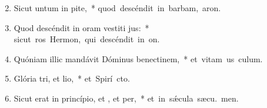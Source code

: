 \begin{flushleft}
\begin{enumerate}[leftmargin=*]
\setcounter{enumi}{1}

\item Sicut untum in pite,~* \mbox{quod descéndit in barbam,  aron.}
\item Quod descéndit in oram vestiti jus:~* \mbox{sicut ros Hermon, qui descéndit in  on.}
\item Quóniam illic mandávit Dóminus benectinem,~* \mbox{et vitam us  culum.}
\item Glória tri, et lio,~* \mbox{et Spirí cto.}
\item Sicut erat in princípio, et , et per,~* \mbox{et in s\'{\ae}cula sæcu. men.}

\end{enumerate}
\end{flushleft}

